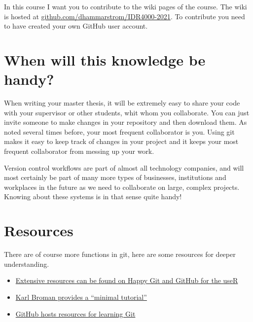\documentclass[
  11pt,
  letterpaper,
]{scrbook}
\providecommand{\tightlist}{%
  \setlength{\itemsep}{0pt}\setlength{\parskip}{0pt}}\usepackage{longtable,booktabs,array}
\begin{document}
In this course I want you to contribute to the wiki pages of the course.
The wiki is hosted at
\href{https://github.com/dhammarstrom/IDR4000-2021}{github.com/dhammarstrom/IDR4000-2021}.
To contribute you need to have created your own GitHub user account.

\hypertarget{when-will-this-knowledge-be-handy}{%
\section{When will this knowledge be
handy?}\label{when-will-this-knowledge-be-handy}}

When writing your master thesis, it will be extremely easy to share your
code with your supervisor or other students, whit whom you collaborate.
You can just invite someone to make changes in your repository and then
download them. As noted several times before, your most frequent
collaborator is you. Using git makes it easy to keep track of changes in
your project and it keeps your most frequent collaborator from messing
up your work.

Version control workflows are part of almost all technology companies,
and will most certainly be part of many more types of businesses,
institutions and workplaces in the future as we need to collaborate on
large, complex projects. Knowing about these systems is in that sense
quite handy!

\hypertarget{resources-3}{%
\section{Resources}\label{resources-3}}

There are of course more functions in git, here are some resources for
deeper understanding.

\begin{itemize}
\tightlist
\item
  \href{https://happygitwithr.com/}{Extensive resources can be found on
  Happy Git and GitHub for the useR}
\item
  \href{https://kbroman.org/github_tutorial/}{Karl Broman provides a
  ``minimal tutorial''}
\item
  \href{https://try.github.io/}{GitHub hosts resources for learning Git}
\end{itemize}
\end{document}
